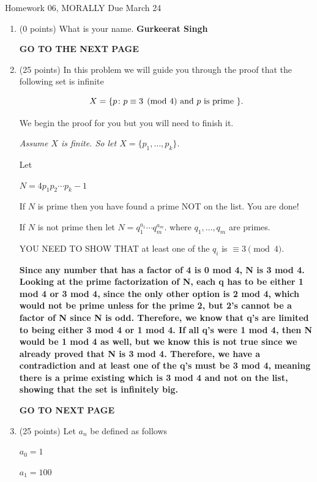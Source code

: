 \documentclass[12pt]{article}
\begin{document}
\centerline{Homework 06, MORALLY Due March 24} 


\begin{enumerate}

\item
(0 points)
What is your name.
\textbf{Gurkeerat Singh}

\vfill 

\centerline{\bf GO TO THE NEXT PAGE}

\newpage

\item
(25 points) 
In this problem we will guide you through the proof that the following set
is infinite

$$X=\{ p \colon p\equiv 3 \pmod 4 \hbox{ and $p$ is prime } \}.$$

We begin the proof for you but you will need to finish it. 

{\it 
Assume $X$ is finite. So let $X=\{p_1,\ldots,p_k\}$. 

Let

$N= 4p_1p_2\cdots p_k - 1$

If $N$ is prime then you have found a prime NOT on the list. You are done!

If $N$ is not prime then let $N=q_1^{a_1}\cdots q_m^{a_m}$. 
where $q_1,\ldots,q_m$ are primes. } 

YOU NEED TO SHOW THAT at least one of the $q_i$ is $\equiv 3 \pmod 4$. 

\textbf{Since any number that has a factor of 4 is 0 mod 4, N is 3 mod 4. Looking at the prime factorization of N, each q has to be either 1 mod 4 or 3 mod 4, since the only other option is 2 mod 4, which would not be prime unless for the prime 2, but 2's cannot be a factor of N since N is odd. Therefore, we know that q's are limited to being either 3 mod 4 or 1 mod 4. If all q's were 1 mod 4, then N would be 1 mod 4 as well, but we know this is not true since we already proved that N is 3 mod 4. Therefore, we have a contradiction and at least one of the q's must be 3 mod 4, meaning there is a prime existing which is 3 mod 4 and not on the list, showing that the set is infinitely big.}


\vfill

\centerline{\bf GO TO NEXT PAGE}

\newpage

\item
(25 points)
Let $a_n$ be defined as follows

$a_0=1$

$a_1=100$


\end{enumerate}
\end{document}
